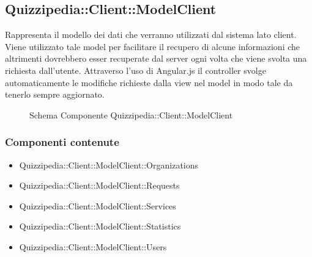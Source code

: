\subsection{Quizzipedia::Client::ModelClient}
Rappresenta il modello dei dati che verranno utilizzati dal sistema lato client. Viene utilizzato tale model per facilitare il recupero di alcune informazioni che altrimenti dovrebbero esser recuperate dal server ogni volta che viene svolta una richiesta dall'utente.
Attraverso l'uso di Angular.js il controller svolge automaticamente le modifiche richieste dalla view nel model in modo tale da tenerlo sempre aggiornato.
\begin{figure}[H]
\centering
\noindent{}
\caption[Schema Componente Quizzipedia::Client::ModelClient]{Schema Componente Quizzipedia::Client::ModelClient}
\end{figure}
\subsubsection{Componenti contenute}
\begin{itemize}
\item Quizzipedia::Client::ModelClient::Organizations
\item Quizzipedia::Client::ModelClient::Requests
\item Quizzipedia::Client::ModelClient::Services
\item Quizzipedia::Client::ModelClient::Statistics
\item Quizzipedia::Client::ModelClient::Users
\end{itemize}
